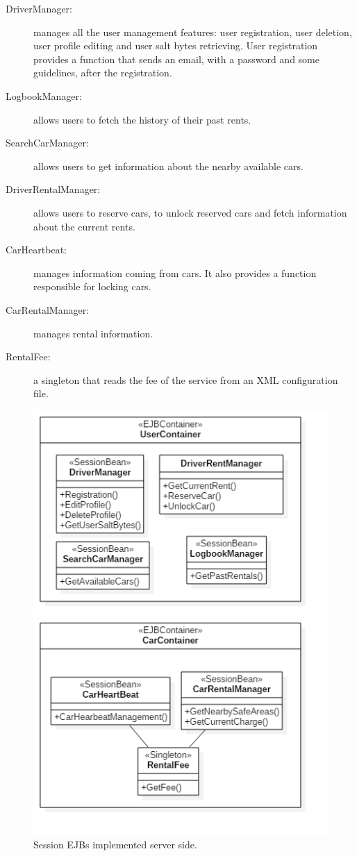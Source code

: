 \begin{description}
	\item[DriverManager:] manages all the user management features: user registration, user deletion, user profile editing and user salt bytes retrieving.
User registration provides a function that sends an email, with a password and some guidelines, after the registration.
	\item[LogbookManager:] allows users to fetch the history of their past rents.
	\item[SearchCarManager:] allows users to get information about the nearby available cars.
	\item[DriverRentalManager:] allows users to reserve cars, to unlock reserved cars and fetch information about the current rents.
	\item[CarHeartbeat:] manages information coming from cars. It also provides a function responsible for locking cars.
	\item[CarRentalManager:] manages rental information.
	\item[RentalFee:] a singleton that reads the fee of the service from an XML configuration file.
\end{description}

\begin{figure}[H]
	\centering
	\includegraphics[width=\textwidth, keepaspectratio]{diagrams/SEJBs.png}
	\caption{Session EJBs implemented server side.}
	\label {fig:session-beans}
\end{figure}

